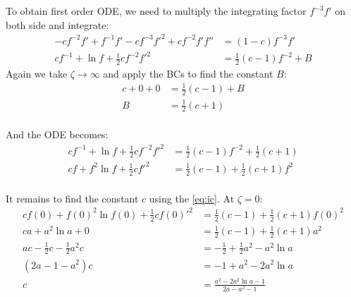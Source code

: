 \documentclass[class=article,crop=false]{standalone}
\begin{document}
To obtain first order ODE, we need to multiply the integrating factor $ f^{-3} f'$ on both side and integrate:
\begin{equation}
\begin{split}
	-cf^{-2}f' + f^{-1}f' - cf^{-3}f'^2+ cf^{-2}f'f'' &= (1-c)f^{-3}f' \\
	cf^{-1} + \ln f + \frac{1}{2} c f^{-2}f'^2 &= \frac{1}{2}(c-1) f^{-2} + B 
\end{split}
\end{equation}
Again we take $ \zeta \to \infty$ and apply the BCs to find the constant $ B$:
\begin{equation}
\begin{split}
	c+ 0 + 0 &= \frac{1}{2}(c-1) + B \\
	B &= \frac{1}{2}(c+1) \\
\end{split}
\end{equation}	

And the ODE becomes:
\begin{equation}
\begin{split}
	cf^{-1} + \ln f + \frac{1}{2} c f^{-2}f'^2 &= \frac{1}{2}(c-1) f^{-2} + \frac{1}{2} (c+1) \\
	cf + f^2 \ln f + \frac{1}{2} c f'^2 &= \frac{1}{2} (c-1) + \frac{1}{2} (c+1)f^2 \\
\end{split}
\end{equation}

It remains to find the constant $c $ using the \cref{eq:ic}. At $ \zeta = 0$:
\begin{equation}
\begin{split}
	cf(0) + f(0)^2 \ln f(0) + \frac{1}{2} c f(0)'^2 &= \frac{1}{2} (c-1) + \frac{1}{2} (c+1)f(0)^2 \\
	ca + a^2 \ln a + 0 &= \frac{1}{2} (c-1) + \frac{1}{2}(c+1) a^2 \\
	ac - \frac{1}{2} c -\frac{1}{2} a^2 c &= -\frac{1}{2} + \frac{1}{2}a^2 - a^2 \ln a  \\
	(2a - 1 - a^2) c&= -1 + a^2 - 2a^2 \ln a \\
	c &= \frac{a^2 - 2a^2 \ln a -1}{2a - a^2 -1 } \\
\end{split}
\end{equation}
\end{document}
